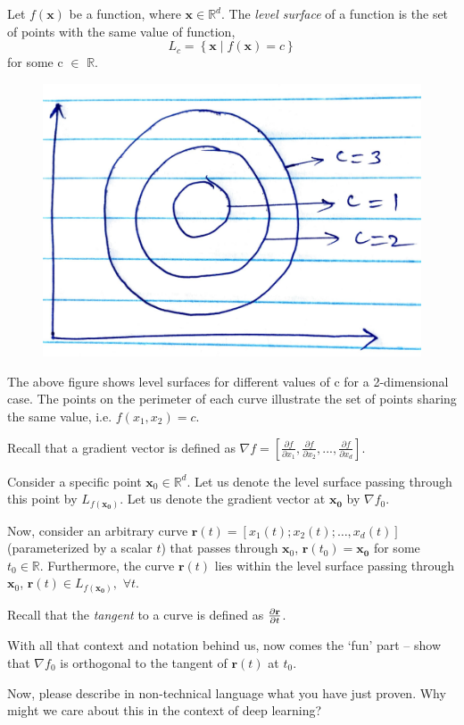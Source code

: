 Let $f(\mathbf{x})$ be a function, where $\mathbf{x} \in \mathbb{R}^d$.
The \textit{level surface} of a function is the set of points with the same value of function, \ie
\begin{equation}
    L_c = \left\{ \mathbf{x} \mid f(\mathbf{x}) = c \right\} \label{q11.ls}
\end{equation}
for some c $\in$ $\mathbb{R}$. 

\begin{figure}[h!]
    \centering
    \includegraphics[scale=0.5]{circle_dl.pdf}
\end{figure}

The above figure shows level surfaces for different values of c for a 2-dimensional case. The points on the perimeter of each curve illustrate the set of points sharing the same value, i.e. $f(x_1, x_2) = c$.

Recall that a gradient vector is defined as $\nabla f = \left[ \frac{\partial f}{\partial x_1}, \frac{\partial f}{\partial x_2}, ..., \frac{\partial f}{\partial x_d} \right]$.

Consider a specific point $\mathbf{x}_0 \in \mathbb{R}^d$. Let us denote the level surface passing through this point by $L_{f(\mathbf{x_0})}$. Let us denote the gradient vector at $\mathbf{x_0}$ by $\nabla f_0$. 

Now, consider an arbitrary curve $\mathbf{r}(t) = \left[x_1(t); x_2(t); \ldots, x_d(t)\right]$ (parameterized by a scalar $t$) that passes through $\mathbf{x}_0$, 
\ie $\mathbf{r}(t_0) = \mathbf{x_0}$ for some $t_0 \in \mathbb{R}$. Furthermore, 
the curve $\mathbf{r}(t)$ lies within the level surface passing through $\mathbf{x}_0$, \ie $\mathbf{r}(t) \in L_{f(\mathbf{x_0})}, \,\, \forall t$.  

Recall that the \emph{tangent} to a curve is defined as $\frac{\partial \mathbf{r}}{\partial t}$. 


With all that context and notation behind us, now comes the `fun' part -- 
show that $\nabla f_0$ is orthogonal to the tangent of $\mathbf{r}(t)$ at $t_0$. 

Now, please describe in non-technical language what you have just proven. Why might we care about this in the context of deep learning? 

